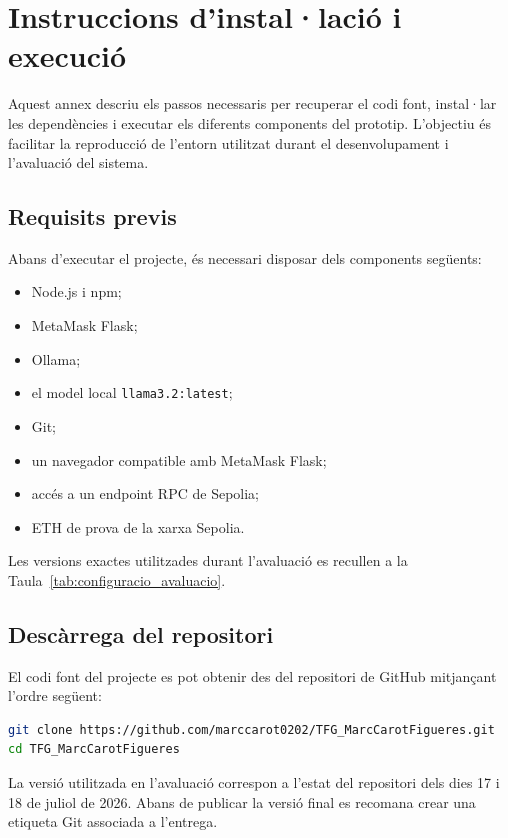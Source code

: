\section{Instruccions d’instal·lació i execució}
\label{annex:installacio}

Aquest annex descriu els passos necessaris per recuperar el codi font, instal·lar les dependències i executar els diferents components del prototip. L’objectiu és facilitar la reproducció de l’entorn utilitzat durant el desenvolupament i l’avaluació del sistema.

\subsection{Requisits previs}

Abans d’executar el projecte, és necessari disposar dels components següents:

\begin{itemize}
    \item Node.js i npm;
    \item MetaMask Flask;
    \item Ollama;
    \item el model local \texttt{llama3.2:latest};
    \item Git;
    \item un navegador compatible amb MetaMask Flask;
    \item accés a un endpoint RPC de Sepolia;
    \item ETH de prova de la xarxa Sepolia.
\end{itemize}

Les versions exactes utilitzades durant l’avaluació es recullen a la Taula~\ref{tab:configuracio_avaluacio}.

\subsection{Descàrrega del repositori}

El codi font del projecte es pot obtenir des del repositori de GitHub mitjançant l’ordre següent:

\begin{lstlisting}[language=bash,breaklines=true,breakatwhitespace=false]
git clone https://github.com/marccarot0202/TFG_MarcCarotFigueres.git
cd TFG_MarcCarotFigueres
\end{lstlisting}

La versió utilitzada en l'avaluació correspon a l'estat del repositori dels dies 17 i 18 de juliol de 2026. Abans de publicar la versió final es recomana crear una etiqueta Git associada a l'entrega.

